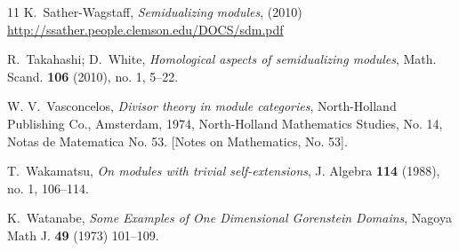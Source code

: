 \documentclass{amsart}
\theoremstyle{plain}
\theoremstyle{definition}
\numberwithin{theorem}{section}
\numberwithin{equation}{section}
\numberwithin{equation}{theorem}
\begin{document}
\begin{thebibliography}{11}
 K.~Sather-Wagstaff, \emph{Semidualizing modules}, (2010) \href{http://ssather.people.clemson.edu/DOCS/sdm.pdf}{http://ssather.people.clemson.edu/DOCS/sdm.pdf}
 	
 R.~Takahashi; D.~White, \emph{Homological aspects of semidualizing modules}, Math. Scand. {\bf 106} (2010), no. 1, 5--22. %

 W. V.~Vasconcelos, \emph{Divisor theory in module categories}, North-Holland Publishing Co., Amsterdam, 1974, North-Holland Mathematics Studies, No. 14, Notas de Matematica No. 53.
[Notes on Mathematics, No. 53]. %

 T.~Wakamatsu, \emph{On modules with trivial self-extensions}, J. Algebra {\bf 114} (1988), no. 1, 106--114. %

 K.~Watanabe, \emph{Some Examples of One Dimensional Gorenstein Domains}, Nagoya Math J. {\bf 49} (1973) 101--109. %

\end{thebibliography}

\end{document}
